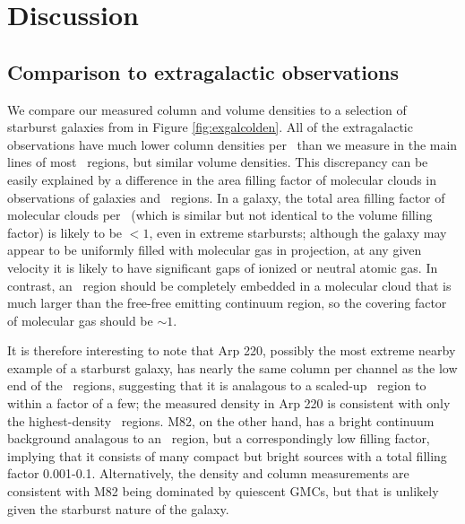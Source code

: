\section{Discussion}
\label{sec:discussion}
\subsection{Comparison to extragalactic observations}
\label{sec:exgal}

We compare our measured column and volume densities to a selection of starburst
galaxies from \citet{Mangum2008} in Figure \ref{fig:exgalcolden}.  All of the
extragalactic observations have much lower column densities per \kms\ than we
measure in the main lines of most \uchii\ regions, but similar volume densities.
This discrepancy can be easily explained by a difference in the area filling factor
of molecular clouds in observations of galaxies and \uchii\ regions.  In a
galaxy, the total area filling factor of molecular clouds per \kms\ (which is
similar but not identical to the volume filling factor) is likely
to be $<1$, even in extreme starbursts; although the galaxy may appear to be
uniformly filled with molecular gas in projection, at any given velocity it is
likely to have significant gaps of ionized or neutral atomic gas.  In contrast,
an \uchii\ region should be completely embedded in a molecular cloud that is
much larger than the free-free emitting continuum region, so the covering
factor of molecular gas should be $\sim1$.
 
It is therefore interesting to note that Arp 220, possibly the most extreme nearby
example of a starburst galaxy, has nearly the same column per channel as the
low end of the \uchii\ regions, suggesting that it is analagous to a scaled-up
\uchii\ region to within a factor of a few; the measured density in Arp 220 is
consistent with only the highest-density \uchii\ regions.  M82, on the other
hand, has a bright continuum background analagous to an \uchii\ region, but a
correspondingly low filling factor, implying that it consists of many 
compact but bright sources with a total filling factor 0.001-0.1.
Alternatively, the density and column measurements are consistent with M82
being dominated by quiescent GMCs, but that is unlikely given the starburst
nature of the galaxy. %

